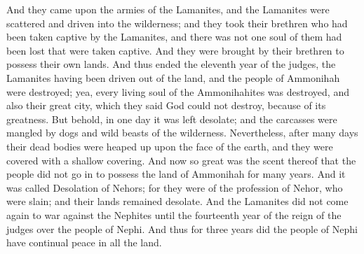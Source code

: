 And they came upon the armies of the Lamanites, and the Lamanites were scattered and driven into the wilderness; and they took their brethren who had been taken captive by the Lamanites, and there was not one soul of them had been lost that were taken captive. And they were brought by their brethren to possess their own lands.
\bverse \iffalse And thus ended the eleventh year of the judges, the Lamanites having been driven out of the land, and the people of Ammonihah were destroyed; yea, every living soul of the Ammonihahites was destroyed, and also their great city, which they said God could not destroy, because of its greatness. \fi
And thus ended the eleventh year of the judges, the Lamanites having been driven out of the land, and the people of Ammonihah were destroyed; yea, every living soul of the Ammonihahites was destroyed, and also their great city, which they said God could not destroy, because of its greatness.
\bverse \iffalse But behold, in one day it was left desolate; and the carcasses were mangled by dogs and wild beasts of the wilderness. \fi
But behold, in one day it was left desolate; and the carcasses were mangled by dogs and wild beasts of the wilderness.
\bverse \iffalse Nevertheless, after many days their dead bodies were heaped up upon the face of the earth, and they were covered with a shallow covering. And now so great was the scent thereof that the people did not go in to possess the land of Ammonihah for many years. And it was called Desolation of Nehors; for they were of the profession of Nehor, who were slain; and their lands remained desolate. \fi
Nevertheless, after many days their dead bodies were heaped up upon the face of the earth, and they were covered with a shallow covering. And now so great was the scent thereof that the people did not go in to possess the land of Ammonihah for many years. And it was called Desolation of Nehors; for they were of the profession of Nehor, who were slain; and their lands remained desolate.
\bverse \iffalse And the Lamanites did not come again to war against the Nephites until the fourteenth year of the reign of the judges over the people of Nephi. And thus for three years did the people of Nephi have continual peace in all the land. \fi
And the Lamanites did not come again to war against the Nephites until the fourteenth year of the reign of the judges over the people of Nephi. And thus for three years did the people of Nephi have continual peace in all the land.
\bverse \iffalse And Alma and Amulek went forth preaching repentance to the people in their temples, and in their sanctuaries, and also in their synagogues, which were built after the manner of the Jews. \fi

